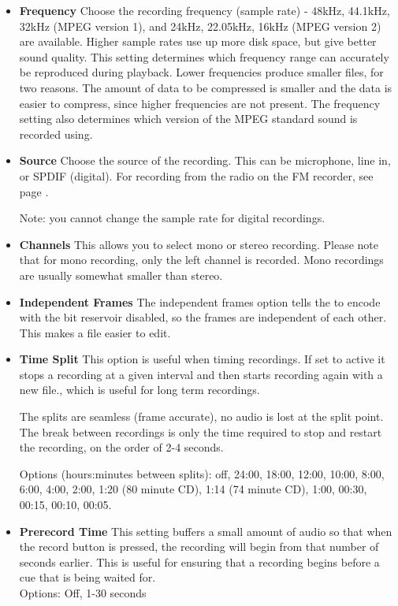 \begin{itemize}
\item \textbf{Frequency} 
Choose the recording frequency (sample rate) {}- 48kHz, 44.1kHz, 32kHz (MPEG version 1), and 24kHz, 22.05kHz, 16kHz (MPEG version 2) are available.  Higher sample rates use up more disk space, but give better sound quality.  This setting determines which frequency range can accurately be reproduced during playback. Lower frequencies produce smaller files, for two reasons.  The amount of data to be compressed is smaller and the data is easier to compress, since higher frequencies are not present.  The frequency setting also determines which version of the MPEG standard sound is recorded using.

\item \textbf{Source}
Choose the source of the recording.  This can be microphone, line in, or SPDIF (digital). For recording from the radio on the FM recorder, see page \pageref{ref:FMradio}.

Note: you cannot change the sample rate for digital recordings.

\item \textbf{Channels}
This allows you to select mono or stereo recording.  Please note that for mono recording, only the left channel is recorded.  Mono recordings are usually somewhat smaller than stereo.

\item \textbf{Independent Frames}
The independent frames option tells the \dap to encode with the bit reservoir disabled, so the frames are independent of each other. This makes a file easier to edit.

\item \textbf{Time Split}
This option is useful when timing recordings. If set to active it stops a recording at a given interval and then starts recording again with a new file., which is useful for long term recordings.

The splits are seamless (frame accurate), no audio is lost at the split point. The break between recordings is only the time required to stop and restart the recording, on the order of 2{}-4 seconds.

Options (hours:minutes between splits): off, 24:00, 18:00, 12:00, 10:00, 8:00, 6:00, 4:00, 2:00, 1:20 (80 minute CD), 1:14 (74 minute  CD), 1:00, 00:30, 00:15, 00:10, 00:05.
\item \textbf{Prerecord Time}
This setting buffers a small amount of audio so that when the record button is pressed, the recording will begin from that number of seconds earlier.  This is useful for ensuring that a recording begins before a cue that is being waited for.\\
Options: Off, 1{}-30 seconds
\end{itemize}

